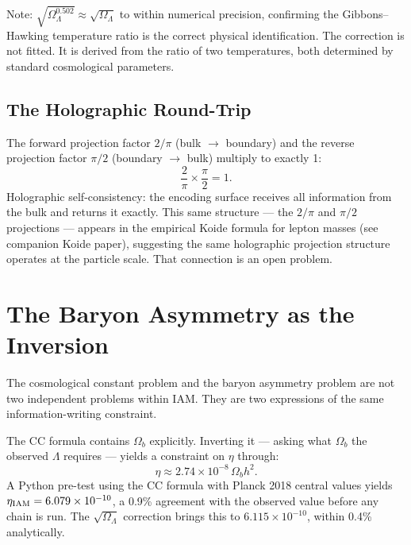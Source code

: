 \documentclass[12pt,a4paper]{article}
\begin{document}
Note: $\sqrt{\Omega_\Lambda^{0.502}} \approx \sqrt{\Omega_\Lambda}$ to within
numerical precision, confirming the Gibbons--Hawking temperature ratio is the
correct physical identification. The correction is not fitted. It is derived
from the ratio of two temperatures, both determined by standard cosmological
parameters.

\subsection{The Holographic Round-Trip}

The forward projection factor $2/\pi$ (bulk $\to$ boundary) and the reverse
projection factor $\pi/2$ (boundary $\to$ bulk) multiply to exactly 1:
\begin{equation}
\frac{2}{\pi} \times \frac{\pi}{2} = 1.
\end{equation}
Holographic self-consistency: the encoding surface receives all information
from the bulk and returns it exactly. This same structure --- the $2/\pi$ and
$\pi/2$ projections --- appears in the empirical Koide formula for lepton masses
(see companion Koide paper), suggesting the same holographic projection structure
operates at the particle scale. That connection is an open problem.

\newpage

\section{The Baryon Asymmetry as the Inversion}
\label{sec:ba}

The cosmological constant problem and the baryon asymmetry problem are not two
independent problems within IAM. They are two expressions of the same
information-writing constraint.

The CC formula contains $\Omega_b$ explicitly. Inverting it --- asking what
$\Omega_b$ the observed $\Lambda$ requires --- yields a constraint on $\eta$
through:
\begin{equation}
\eta \approx 2.74 \times 10^{-8}\,\Omega_b h^2.
\end{equation}
A Python pre-test using the CC formula with Planck 2018 central values yields
$\eta_{\rm IAM} = 6.079 \times 10^{-10}$, a 0.9\% agreement with the observed
value before any chain is run. The $\sqrt{\Omega_\Lambda}$ correction brings
this to $6.115 \times 10^{-10}$, within 0.4\% analytically.
\end{document}
